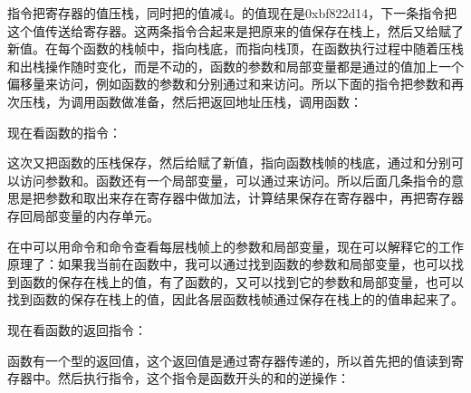 

指令把寄存器的值压栈，同时把的值减4。的值现在是0xbf822d14，下一条指令把这个值传送给寄存器。这两条指令合起来是把原来的值保存在栈上，然后又给赋了新值。在每个函数的栈帧中，指向栈底，而指向栈顶，在函数执行过程中随着压栈和出栈操作随时变化，而是不动的，函数的参数和局部变量都是通过的值加上一个偏移量来访问，例如函数的参数和分别通过和来访问。所以下面的指令把参数和再次压栈，为调用函数做准备，然后把返回地址压栈，调用函数：




现在看函数的指令：




这次又把函数的压栈保存，然后给赋了新值，指向函数栈帧的栈底，通过和分别可以访问参数和。函数还有一个局部变量，可以通过来访问。所以后面几条指令的意思是把参数和取出来存在寄存器中做加法，计算结果保存在寄存器中，再把寄存器存回局部变量的内存单元。



在中可以用命令和命令查看每层栈帧上的参数和局部变量，现在可以解释它的工作原理了：如果我当前在函数中，我可以通过找到函数的参数和局部变量，也可以找到函数的保存在栈上的值，有了函数的，又可以找到它的参数和局部变量，也可以找到函数的保存在栈上的值，因此各层函数栈帧通过保存在栈上的的值串起来了。



现在看函数的返回指令：




函数有一个型的返回值，这个返回值是通过寄存器传递的，所以首先把的值读到寄存器中。然后执行指令，这个指令是函数开头的和的逆操作：


